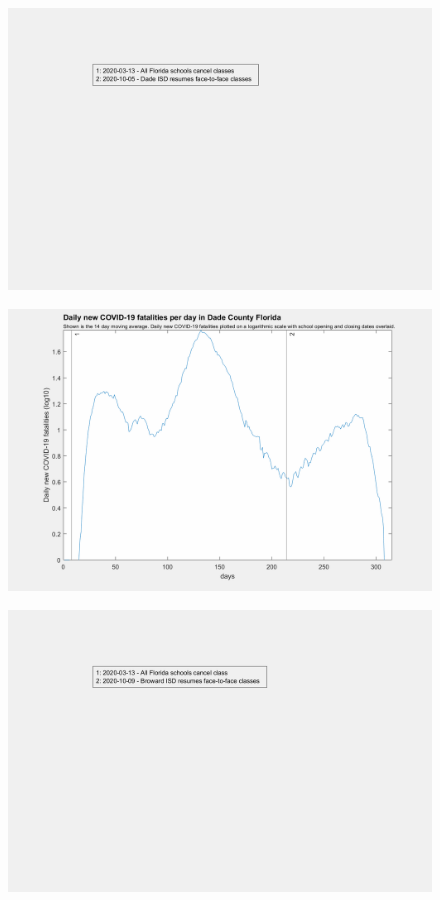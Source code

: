 \documentclass[]{article}
\begin{document}
\begin{figure}[!h]
	\includegraphics[width=\linewidth]{legends/dade_school_legend.png}
	\caption{}
	\label{fig:legends/dade_school_legendLabel}
\end{figure}

\begin{figure}[!h]
	\includegraphics[width=\linewidth]{images/dade_fatalities_school_log.png}
	\caption{}
	\label{fig:images/dade_fatalities_school_logLabel}
\end{figure}

\begin{figure}[!h]
	\includegraphics[width=\linewidth]{legends/broward_school_legend.png}
	\caption{}
	\label{fig:legends/broward_school_legendLabel}
\end{figure}
\end{document}
